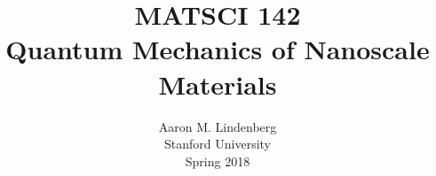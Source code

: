 \documentclass[12pt, english]{book}
\title{{\LARGE \textbf{MATSCI 142}} \\ Quantum Mechanics of Nanoscale Materials \vspace{10ex}}
\author{\vspace{1ex} Aaron M. Lindenberg \\ \vspace{1ex} Stanford University \\ Spring 2018}
\date{}
\begin{document}
	
\frontmatter %
\let\cleardoublepage\clearpage %
\maketitle
\tableofcontents


%

\mainmatter 		%












\appendix








\end{document}
